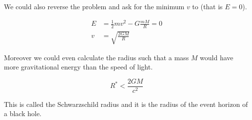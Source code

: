 \documentclass[10pt]{extarticle}
\begin{document}
We could also reverse the problem and ask for the minimum $v$ to  (that is $E = 0$).

\begin{align*}
    E & = \frac{1}{2} m v^2 - G \frac{mM}{R} = 0 \\
    v & = \sqrt{\frac{2 G M}{R}}
\end{align*}

Moreover we could even calculate the radius such that a mass $M$ would have more gravitational energy than the speed of light.

$$
    R^* < \frac{2 G M}{c^2}
$$

This is called the Schwarzschild radius and it is the radius of the event horizon of a black hole.
\end{document}
